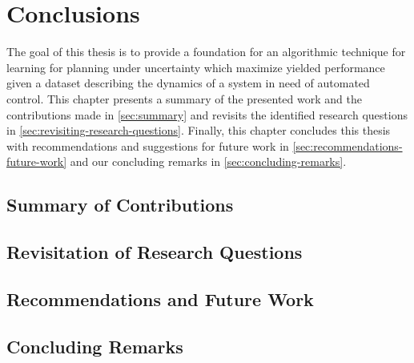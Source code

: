\chapter{Conclusions}
\label{ch:conclusions}

The goal of this thesis is to provide a foundation for an algorithmic technique for learning  for planning under uncertainty which maximize yielded performance given a dataset describing the dynamics of a system in need of automated control.
This chapter presents a summary of the presented work and the contributions made in \autoref{sec:summary} and revisits the identified research questions in \autoref{sec:revisiting-research-questions}.
Finally, this chapter concludes this thesis with recommendations and suggestions for future work in \autoref{sec:recommendations-future-work} and our concluding remarks in \autoref{sec:concluding-remarks}.


\section{Summary of Contributions}
\label{sec:summary}


\section{Revisitation of Research Questions}
\label{sec:revisiting-research-questions}


\section{Recommendations and Future Work}
\label{sec:recommendations-future-work}

% 

\section{Concluding Remarks}
\label{sec:concluding-remarks}

%